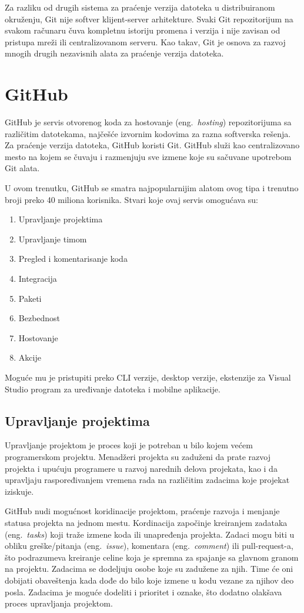 \documentclass[12pt]{report}
\begin{document}
Za razliku od drugih sistema za praćenje verzija datoteka u distribuiranom okruženju, Git nije softver klijent-server arhitekture. Svaki Git repozitorijum na svakom računaru čuva kompletnu istoriju promena i verzija i nije zavisan od pristupa mreži ili centralizovanom serveru. Kao takav, Git je osnova za razvoj mnogih drugih nezavisnih alata za praćenje verzija datoteka.

\section{GitHub}
GitHub \cite{github} je servis otvorenog koda za hostovanje (eng.\ \textit{hosting}) repozitorijuma sa različitim datotekama, najčešće izvornim kodovima za razna softverska rešenja. Za praćenje verzija datoteka, GitHub koristi Git. GitHub služi kao centralizovano mesto na kojem se čuvaju i razmenjuju sve izmene koje su sačuvane upotrebom Git alata.

U ovom trenutku, GitHub se smatra najpopularnijim alatom ovog tipa i trenutno broji preko 40 miliona korisnika. Stvari koje ovaj servis omogućava su:

\begin{enumerate}
    \item Upravljanje projektima
    \item Upravljanje timom
    \item Pregled i komentarisanje koda
    \item Integracija
    \item Paketi
    \item Bezbednost
    \item Hostovanje
    \item Akcije
\end{enumerate}

Moguće mu je pristupiti preko CLI verzije, desktop verzije, ekstenzije za Visual Studio program za uređivanje datoteka i mobilne aplikacije.

\subsection{Upravljanje projektima}
Upravljanje projektom je proces koji je potreban u bilo kojem većem programerskom projektu. Menadžeri projekta su zaduženi da prate razvoj projekta i upućuju programere u razvoj narednih delova projekata, kao i da upravljaju raspoređivanjem vremena rada na različitim zadacima koje projekat iziskuje.

GitHub nudi mogućnost koridinacije projektom, praćenje razvoja i menjanje statusa projekta na jednom mestu. Kordinacija započinje kreiranjem zadataka (eng.\ \textit{tasks}) koji traže izmene koda ili unapređenja projekta. Zadaci mogu biti u obliku greške/pitanja (eng.\ \textit{issue}), komentara (eng.\ \textit{comment}) ili pull-request-a, što podrazumeva kreiranje celine koja je spremna za spajanje sa glavnom granom na projektu. Zadacima se dodeljuju osobe koje su zadužene za njih. Time će oni dobijati obaveštenja kada dođe do bilo koje izmene u kodu vezane za njihov deo posla. Zadacima je moguće dodeliti i prioritet i oznake, što dodatno olakšava proces upravljanja projektom.
\end{document}
